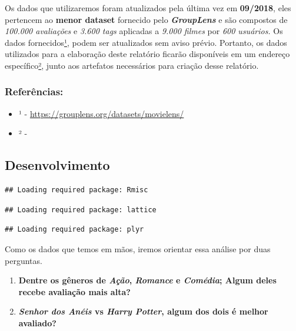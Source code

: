 \documentclass[]{article}
\providecommand{\tightlist}{%
  \setlength{\itemsep}{0pt}\setlength{\parskip}{0pt}}
\begin{document}
Os dados que utilizaremos foram atualizados pela última vez em
\textbf{09/2018}, eles pertencem ao \textbf{menor dataset} fornecido
pelo \textbf{\emph{GroupLens}} e são compostos de \emph{100.000
avaliações} e \emph{3.600 tags} aplicadas a \emph{9.000 filmes} por
\emph{600 usuários.} Os dados
fornecidos\href{https://grouplens.org/datasets/movielens/}{¹}, podem ser
atualizados sem aviso prévio. Portanto, os dados utilizados para a
elaboração deste relatório ficarão disponíveis em um endereço
específico\protect\hyperlink{data}{²}, junto aos artefatos necessários
para criação desse relatório.

\hypertarget{referuxeancias}{%
\subsubsection{Referências:}\label{referuxeancias}}

\begin{itemize}
\tightlist
\item
  ¹ - \url{https://grouplens.org/datasets/movielens/}
\item
  ² - 
\end{itemize}

\newpage

\hypertarget{desenvolvimento}{%
\subsection{Desenvolvimento}\label{desenvolvimento}}

\begin{verbatim}
## Loading required package: Rmisc
\end{verbatim}

\begin{verbatim}
## Loading required package: lattice
\end{verbatim}

\begin{verbatim}
## Loading required package: plyr
\end{verbatim}

Como os dados que temos em mãos, iremos orientar essa análise por duas
perguntas.

\begin{enumerate}
\def\labelenumi{\arabic{enumi}.}
\tightlist
\item
  \textbf{Dentre os gêneros de \emph{Ação}, \emph{Romance} e
  \emph{Comédia}; Algum deles recebe avaliação mais alta?}
\item
  \textbf{\emph{Senhor dos Anéis} vs \emph{Harry Potter}, algum dos dois
  é melhor avaliado?}
\end{enumerate}
\end{document}
